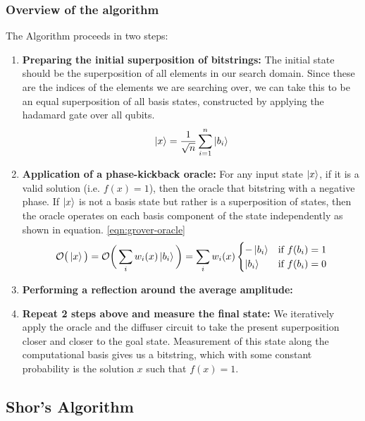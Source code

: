\subsubsection{Overview of the algorithm}

The Algorithm proceeds in two steps:
\begin{enumerate}
    \item \textbf{Preparing the initial superposition of bitstrings:} The initial state should be the superposition of all elements in our search domain. Since these are the indices of the elements we are searching over, we can take this to be an equal superposition of all basis states, constructed by applying the hadamard gate over all qubits.
    \begin{equation}
        \ket{x} = \frac{1}{\sqrt{n}} \sum_{i=1}^{n} \ket{b_i}
    \end{equation}
    \item \textbf{Application of a phase-kickback oracle:} For any input state $\ket{x}$, if it is a valid solution (i.e. $f(x) = 1$), then the oracle that bitstring with a negative phase. If $\ket{x}$ is not a basis state but rather is a superposition of states, then the oracle operates on each basis component of the state independently as shown in equation. \ref{eqn:grover-oracle}
    \begin{equation}\label{eqn:grover-oracle}
        \mathcal{O} \big(\ket{x} \big) = \mathcal{O}\bigg(\sum_i w_i(x) \ket{b_i} \bigg) = \sum_i w_i(x) \begin{cases}
            -\ket{b_i} & \text{if } f(b_i) = 1 \\
            \ket{b_i} & \text{if } f(b_i) = 0
        \end{cases}
    \end{equation}
    \item \textbf{Performing a reflection around the average amplitude:} 
    \item \textbf{Repeat 2 steps above and measure the final state:} We iteratively apply the oracle and the diffuser circuit to take the present superposition closer and closer to the goal state. Measurement of this state along the computational basis gives us a bitstring, which with some constant probability is the solution $x$ such that $f(x) = 1$.
\end{enumerate}

\subsection{Shor's Algorithm}



